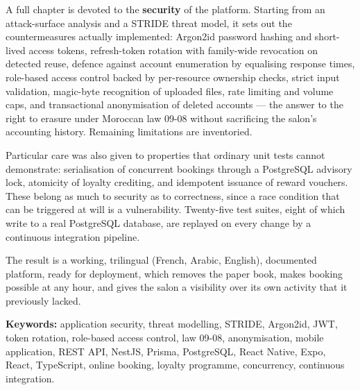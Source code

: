 \vspace{0.3cm}

A full chapter is devoted to the \textbf{security} of the platform. Starting
from an attack-surface analysis and a STRIDE threat model, it sets out the
countermeasures actually implemented: Argon2id password hashing and short-lived
access tokens, refresh-token rotation with family-wide revocation on detected
reuse, defence against account enumeration by equalising response times,
role-based access control backed by per-resource ownership checks, strict input
validation, magic-byte recognition of uploaded files, rate limiting and volume
caps, and transactional anonymisation of deleted accounts --- the answer to the
right to erasure under Moroccan law 09-08 without sacrificing the salon's
accounting history. Remaining limitations are inventoried.

\vspace{0.3cm}

Particular care was also given to properties that ordinary unit tests cannot
demonstrate: serialisation of concurrent bookings through a PostgreSQL advisory
lock, atomicity of loyalty crediting, and idempotent issuance of reward
vouchers. These belong as much to security as to correctness, since a race
condition that can be triggered at will is a vulnerability. Twenty-five test
suites, eight of which write to a real PostgreSQL database, are replayed on
every change by a continuous integration pipeline.

\vspace{0.3cm}

The result is a working, trilingual (French, Arabic, English), documented
platform, ready for deployment, which removes the paper book, makes booking
possible at any hour, and gives the salon a visibility over its own activity
that it previously lacked.

\vspace{0.6cm}

\textbf{Keywords:} application security, threat modelling, STRIDE, Argon2id,
JWT, token rotation, role-based access control, law 09-08, anonymisation,
mobile application, REST API, NestJS, Prisma, PostgreSQL, React Native, Expo,
React, TypeScript, online booking, loyalty programme, concurrency, continuous
integration.



